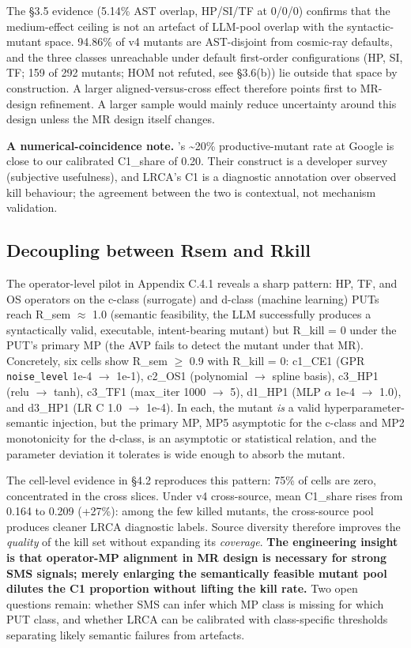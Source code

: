 \documentclass[manuscript,screen,review]{acmart}
\begin{document}
The §3.5 evidence (5.14\% AST overlap, HP/SI/TF at 0/0/0) confirms that
the medium-effect ceiling is not an artefact of LLM-pool overlap with
the syntactic-mutant space. 94.86\% of v4 mutants are AST-disjoint from
cosmic-ray defaults, and the three classes unreachable under default
first-order configurations (HP, SI, TF; 159 of 292 mutants; HOM not
refuted, see §3.6(b)) lie outside that space by construction. A
larger aligned-versus-cross effect therefore points first to MR-design
refinement. A larger sample would mainly reduce uncertainty around this
design unless the MR design itself changes.

\textbf{A numerical-coincidence note.} \citeauthor{1929c365d171c78c9c24b242b5b57e2832bc907b}'s \citeyearpar{1929c365d171c78c9c24b242b5b57e2832bc907b}
\textasciitilde20\% productive-mutant rate at Google is close to our
calibrated C1\_share of 0.20. Their construct is a developer survey
(subjective usefulness), and LRCA's C1 is a diagnostic annotation over
observed kill behaviour; the agreement between the two is contextual,
not mechanism validation.

\subsection{Decoupling between Rsem and Rkill}\label{decoupling-between-r_sem-and-r_kill}

The operator-level pilot in Appendix C.4.1 reveals a sharp pattern: HP,
TF, and OS operators on the c-class (surrogate) and d-class (machine
learning) PUTs reach R\_sem $\approx$ 1.0 (semantic feasibility, the LLM
successfully produces a syntactically valid, executable, intent-bearing
mutant) but R\_kill = 0 under the PUT's primary MP (the AVP fails to
detect the mutant under that MR). Concretely, six cells show R\_sem $\geq$
0.9 with R\_kill = 0: c1\_CE1 (GPR \texttt{noise\_level} 1e-4 $\to$ 1e-1),
c2\_OS1 (polynomial $\to$ spline basis), c3\_HP1 (relu $\to$ tanh), c3\_TF1
(max\_iter 1000 $\to$ 5), d1\_HP1 (MLP $\alpha$ 1e-4 $\to$ 1.0), and d3\_HP1 (LR C 1.0
$\to$ 1e-4). In each, the mutant \emph{is} a valid hyperparameter-semantic
injection, but the primary MP, MP5 asymptotic for the c-class and MP2
monotonicity for the d-class, is an asymptotic or statistical relation,
and the parameter deviation it tolerates is wide enough to absorb the
mutant.

The cell-level evidence in §4.2 reproduces this pattern: 75\% of cells
are zero, concentrated in the cross slices. Under v4 cross-source, mean
C1\_share rises from 0.164 to 0.209 (+27\%): among the few killed
mutants, the cross-source pool produces cleaner LRCA diagnostic labels.
Source diversity therefore improves the \emph{quality} of the kill set
without expanding its \emph{coverage}. \textbf{The engineering insight is that
operator-MP alignment in MR design is necessary for strong SMS signals;
merely enlarging the semantically feasible mutant pool dilutes the C1
proportion without lifting the kill rate.} Two open questions remain:
whether SMS can infer which MP class is missing for which PUT class, and
whether LRCA can be calibrated with class-specific thresholds separating
likely semantic failures from artefacts.
\end{document}
